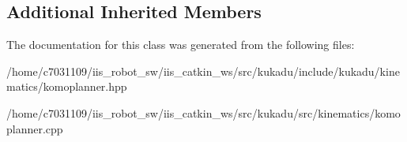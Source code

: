 \subsection*{Additional Inherited Members}


The documentation for this class was generated from the following files\-:\begin{DoxyCompactItemize}
\item 
/home/c7031109/iis\-\_\-robot\-\_\-sw/iis\-\_\-catkin\-\_\-ws/src/kukadu/include/kukadu/kinematics/komoplanner.\-hpp\item 
/home/c7031109/iis\-\_\-robot\-\_\-sw/iis\-\_\-catkin\-\_\-ws/src/kukadu/src/kinematics/komoplanner.\-cpp\end{DoxyCompactItemize}
